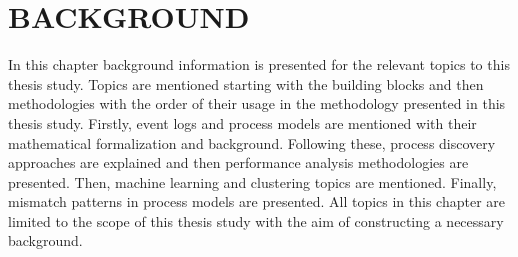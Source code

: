 
\chapter{BACKGROUND}
\label{chp:background}
In this chapter background information is presented for the relevant topics to this thesis study. Topics are mentioned starting with the building blocks and then methodologies with the order of their usage in the methodology presented in this thesis study. Firstly, event logs and process models are mentioned with their mathematical formalization and background. Following these, process discovery approaches are explained and then performance analysis methodologies are presented. Then, machine learning and clustering topics are mentioned. Finally, mismatch patterns in process models are presented. All topics in this chapter are limited to the scope of this thesis study with the aim of constructing a necessary background.

